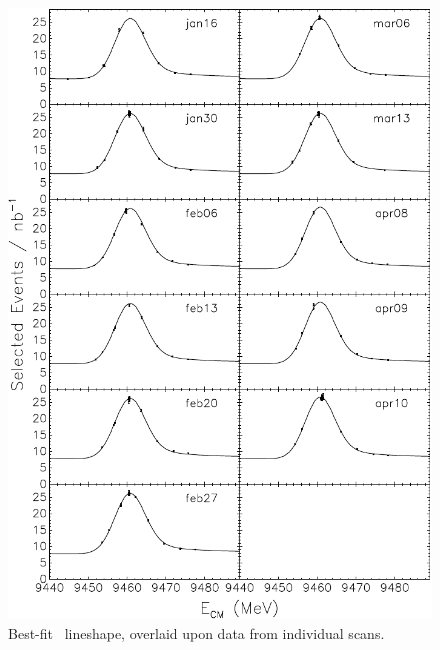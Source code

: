 \documentclass{cornell}
\begin{document}
\begin{figure}[p]
  \begin{center}
    \includegraphics[width=0.9\linewidth]{newnewplots/allscanss}
  \end{center}
  \caption[Best-fit lineshape for each \us\ scan]{\label{allscanss} Best-fit \us\ lineshape,
  overlaid upon data from individual scans.}
\end{figure}
\end{document}
